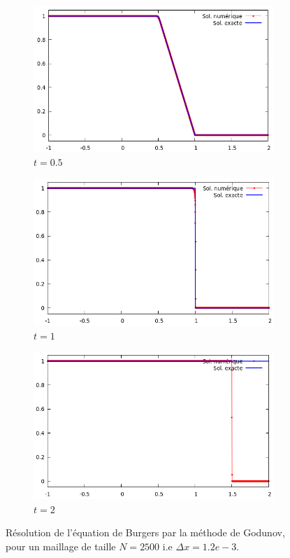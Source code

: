 \documentclass[
	french,
	11pt, %
]{fphw}
\begin{document}
\begin{figure}[H]
	\centering
	\begin{subfigure}{0.32\textwidth}
		\centering
		\includegraphics[width=\textwidth]{Burgers8.png}
		\caption{$t=0.5$}
	\end{subfigure}
	\begin{subfigure}{0.32\textwidth}
		\centering
		\includegraphics[width=\textwidth]{Burgers9.png}
		\caption{$t=1$}
	\end{subfigure}
	\begin{subfigure}{0.32\textwidth}
		\centering
		\includegraphics[width=\textwidth]{Burgers10.png}
		\caption{$t=2$}
		\label{fig:BurgersFaux3}
\end{subfigure}
	\caption{Résolution de l'équation de Burgers par la méthode de Godunov, pour un maillage de taille $N=2500$ i.e $\Delta x = 1.2e-3$.}
	\label{fig:Burgers3}
\end{figure}
\end{document}
